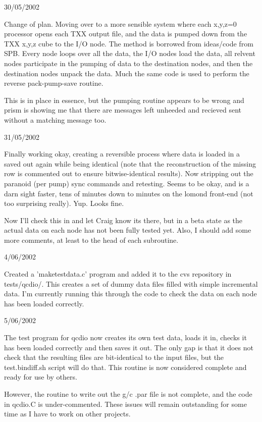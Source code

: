 \documentclass[12pt]{article}
\begin{document}
30/05/2002

Change of plan.  Moving over to a more sensible system where each x,y,z=0
processor opens each TXX output file, and the data is pumped down from the
TXX x,y,z cube to the I/O node.  The method is borrowed from ideas/code from
SPB.  Every node loops over all the data, the I/O nodes load the data,
all relvent nodes participate in the pumping of data to the destination nodes,
and then the destination nodes unpack the data.  Much the same code is used to
perform the reverse pack-pump-save routine.

This is in place in essence, but the pumping routine appears to be wrong and
prism is showing me that there are messages left unheeded and recieved sent
without a matching message too.

31/05/2002

Finally working okay, creating a reversible process where data is loaded in a
saved out again while being identical (note that the reconstruction of the
missing row is commented out to ensure bitwise-identical results).  Now
stripping out the paranoid (per pump) sync commands and retesting.  Seems to
be okay, and is a darn sight faster, tens of minutes down to minutes on the
lomond front-end (not too surprising really). Yup.  Looks fine.

Now I'll check this in and let Craig know its there, but in a beta state as
the actual data on each node has not been fully tested yet.  Also, I should
add some more comments, at least to the head of each subroutine.

4/06/2002

Created a 'maketestdata.c' program and added it to the cvs repository in
tests/qcdio/.  This creates a set of dummy data files filled with simple
incremental data.  I'm currently running this through the code to check the
data on each node has been loaded correctly.

5/06/2002

The test program for qcdio now creates its own test data, loads it in, checks
it has been loaded correctly and then saves it out.  The only gap is that it
does not check that the resulting files are bit-identical to the input files,
but the test.bindiff.sh script will do that.  This routine is now considered
complete and ready for use by others.

However, the routine to write out the g/c .par file is not complete, and the
code in qcdio.C is under-commented.  These issues will remain outstanding for
some time as I have to work on other projects.
\end{document}
